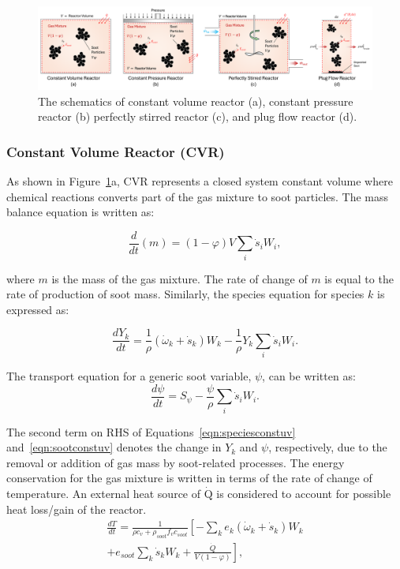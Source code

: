 \begin{figure}[H]
	\centering
	\includegraphics[width=1\textwidth]{Figures/Theory/reactors.pdf}
	\caption{The schematics of constant volume reactor (a), constant pressure reactor (b) perfectly stirred reactor (c), and plug flow reactor (d).}
	\label{fig:reactors} 
\end{figure}


\subsubsection{Constant Volume Reactor (CVR)}
\label{sec:cvr}
As shown in Figure~\ref{fig:reactors}a, CVR represents a closed system constant volume where chemical reactions converts part of the gas mixture to soot particles. The mass balance equation is written as:

\begin{equation}
	\frac{d}{dt}(m) = (1-\varphi)V \sum_i \dot s_i W_i,
	\label{eqn:contconstuv}
\end{equation} 

\noindent where $m$ is the mass of the gas mixture. The rate of change of $m$ is equal to the rate of production of soot mass.
Similarly, the species equation for species $k$ is expressed as:

\begin{equation}
	\frac{dY_k}{dt}
	=
	\frac{1}{\rho}
	\left(
		{\dot{\omega}}_k
		+
		{\dot{s}}_k
	\right)W_k
	-\frac{1}{\rho}Y_k\sum_{i}{{\dot{s}}_i W_i}
	\label{eqn:speciesconstuv}.
\end{equation}

The transport equation for a generic soot variable, $\psi$, can be written as:
\begin{equation}
	\frac{d \psi}{d t}= S_{\psi} - \frac{\psi}{\rho} \sum_i \dot{s}_i W_i
	\label{eqn:sootconstuv}.
\end{equation}

The second term on RHS of Equations~\eqref{eqn:speciesconstuv} and~\eqref{eqn:sootconstuv} denotes the change in $Y_k$ and $\psi$, respectively, due to the removal or addition of gas mass by soot-related processes.
The energy conservation for the gas mixture is written in terms of the rate of change of temperature. An external heat source of $\mathrm{\dot{Q}}$ is considered to account for possible heat loss/gain of the reactor.
\begin{equation}
	\begin{split}
		\frac{d T}{d t}=
		\frac{1}{\rho c_v+\rho_{soot}f_v c_{soot}}
		\left[
			-\sum_k e_k
				\left(
					\dot{\omega}_k+\dot{s}_k
				\right) W_k
		\right. \\
		\left.
			+e_{soot}\sum_k \dot{s}_k W_k
			+\frac{\dot{Q}}{V(1-\varphi)}
		\right],
	\end{split}
	\label{eqn:energyconstuv}
\end{equation}

